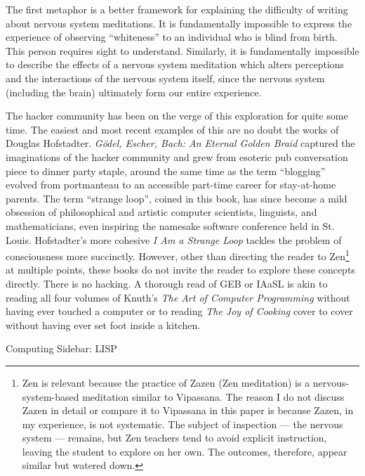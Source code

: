 \documentclass{article}
\begin{document}
The first metaphor is a better framework for explaining the difficulty of writing about nervous system meditations. It is fundamentally impossible to express the experience of observing ``whiteness'' to an individual who is blind from birth. This person requires sight to understand. Similarly, it is fundamentally impossible to describe the effects of a nervous system meditation which alters perceptions and the interactions of the nervous system itself, since the nervous system (including the brain) ultimately form our entire experience.

The hacker community has been on the verge of this exploration for quite some time. The easiest and most recent examples of this are no doubt the works of Douglas Hofstadter. \textit{Gödel, Escher, Bach: An Eternal Golden Braid} captured the imaginations of the hacker community and grew from esoteric pub conversation piece to dinner party staple, around the same time as the term ``blogging'' evolved from portmanteau to an accessible part-time career for stay-at-home parents. The term ``strange loop'', coined in this book, has since become a mild obsession of philosophical and artistic computer scientists, linguists, and mathematicians, even inspiring the namesake software conference held in St. Louis. Hofstadter's more cohesive \textit{I Am a Strange Loop} tackles the problem of consciousness more succinctly. However, other than directing the reader to Zen\footnote{Zen is relevant because the practice of Zazen (Zen meditation) is a nervous-system-based meditation similar to Vipassana. The reason I do not discuss Zazen in detail or compare it to Vipassana in this paper is because Zazen, in my experience, is not systematic. The subject of inspection — the nervous system — remains, but Zen teachers tend to avoid explicit instruction, leaving the student to explore on her own. The outcomes, therefore, appear similar but watered down.} at multiple points, these books do not invite the reader to explore these concepts directly. There is no hacking. A thorough read of GEB or IAaSL is akin to reading all four volumes of Knuth's \textit{The Art of Computer Programming} \cite{taocp} without having ever touched a computer or to reading \textit{The Joy of Cooking} \cite{joyofcooking} cover to cover without having ever set foot inside a kitchen.

\pagebreak

\begin{center}
  \Huge{Computing Sidebar: LISP}
\end{center}
\end{document}
